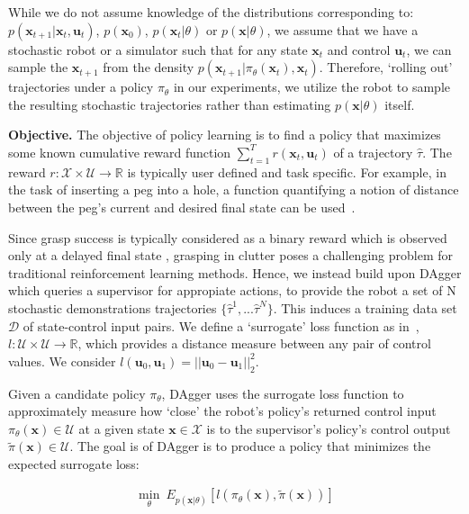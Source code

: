 \documentclass[10pt, conference]{ieeeconf}      %
\newcommand{\bu}{\mathbf{u}}
\newcommand{\bx}{\mathbf{x}}
\begin{document}
While we do not assume knowledge of the distributions corresponding to: $p(\bx_{t+1}|\bx_t,\bu_t)$, $p(\bx_0)$, $p(\bx_t|
\theta)$ or $p(\bx|\theta)$, we assume that we have a stochastic robot or a simulator such that for any state
$\bx_t$ and control $\bu_t$, we can sample the $\bx_{t+1}$ from the density $p(\bx_{t+1}|\pi_{\theta}(\bx_t),\bx_t)$. 
Therefore, `rolling out' trajectories under a policy
$\pi_{\theta}$ in our experiments, we utilize the robot to sample the resulting stochastic trajectories rather than
estimating $p(\bx|\theta)$ itself.

\noindent\textbf{Objective.} The objective of policy learning is to find a policy that maximizes some known cumulative
reward function $\sum^T_{t=1} r(\bx_t,\bu_t)$ of a trajectory $\hat{\tau}$. The reward $r:\mathcal{X}\times
\mathcal{U}\to \mathbb{R}$ is typically user defined and task specific. 
For example, in the task of inserting a peg into a hole, a function quantifying a notion of distance between the peg's
current and desired final state can be used~\cite{levine2015end}.  

Since grasp success is typically considered as a binary reward which is observed only at a delayed final state \cite{kitaevphysics}, 
grasping in clutter poses a challenging problem for traditional reinforcement learning methods. Hence, we instead build
upon DAgger which queries a supervisor for appropiate actions, to provide the robot a set of N stochastic demonstrations trajectories $\lbrace \hat{\tau}^1,...\hat{\tau}^N \rbrace$. This induces a training data set $\mathcal{D}$ of state-control input pairs. 
We define a `surrogate' loss function as in~\cite{ross2010reduction}, $l:\mathcal{U}\times \mathcal{U}\to \mathbb{R}$, which provides a distance
measure between any pair of control values. We consider $l(\bu_0,\bu_1) = ||\bu_0-\bu_1||^2_2$.

Given a candidate policy $\pi_{\theta}$, DAgger uses the surrogate loss function to approximately measure how `close' the robot's policy's
returned control input $\pi_{\theta}(\bx)\in \mathcal{U}$ at a given state $\bx\in \mathcal{X}$ is to the supervisor's policy's control output
$\tilde{\pi}(\bx)\in \mathcal{U}$. The goal is of DAgger is to produce a policy that minimizes the expected surrogate loss:


 \vspace{-2ex}
\begin{align}\label{eq:LFD_obj}
\underset{\theta}{\min} \: E_{p(\bx|\theta)} [l(\pi_\theta(\bx),\tilde{\pi}(\bx))]
\end{align}
\end{document}

